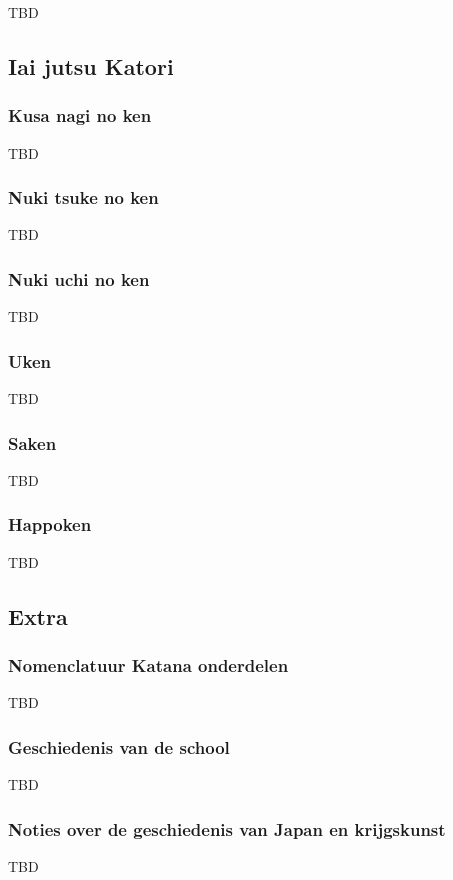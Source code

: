 TBD

\subsection{Iai jutsu Katori}

\subsubsection{Kusa nagi no ken}

TBD

\subsubsection{Nuki tsuke no ken}

TBD

\subsubsection{Nuki uchi no ken}

TBD

\subsubsection{Uken}

TBD

\subsubsection{Saken}

TBD

\subsubsection{Happoken}

TBD

\subsection{Extra}

\subsubsection{Nomenclatuur Katana onderdelen}

TBD

\subsubsection{Geschiedenis van de school}

TBD

\subsubsection{Noties over de geschiedenis van Japan en krijgskunst}

TBD
